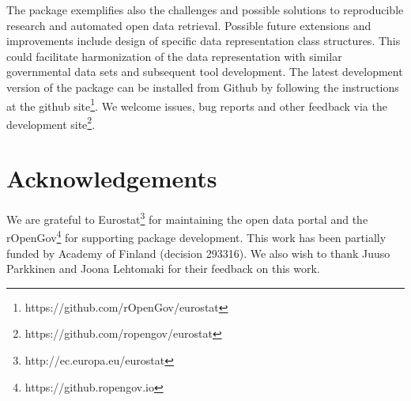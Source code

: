 The package exemplifies also the challenges and possible solutions to
reproducible research and automated open data retrieval. Possible
future extensions and improvements include design of specific data
representation class structures. This could facilitate harmonization
of the data representation with similar governmental data sets and
subsequent tool development. The latest development version of the
package can be installed from Github by following the instructions at
the github site\footnote{https://github.com/rOpenGov/eurostat}. We welcome
issues, bug reports and other feedback via the development
site\footnote{https://github.com/ropengov/eurostat}.


\section*{Acknowledgements}

We are grateful to Eurostat\footnote{http://ec.europa.eu/eurostat} for
maintaining the open data portal and the
rOpenGov\footnote{https://github.ropengov.io} for supporting 
package development. This work has been partially funded by Academy of
Finland (decision 293316). We also wish to thank Juuso Parkkinen and Joona Lehtomaki for their feedback on this work.




\address{Leo Lahti\\
  Department of Mathematics and Statistics\\
  PO Box 20014 University of Turku\\
  Finland\\}

\address{Janne Huovari\\
  Affiliation\\
  Address\\
  Country\\}

\address{Markus Kainu\\
  Affiliation\\
  Address\\
  Country\\}

\address{Przemyslaw Biecek\\
  Faculty of Mathematics, Informatics, and Mechanics\\
  University of Warsaw\\
  Banacha 2, 02-097 Warsaw\\
  Poland\\}

